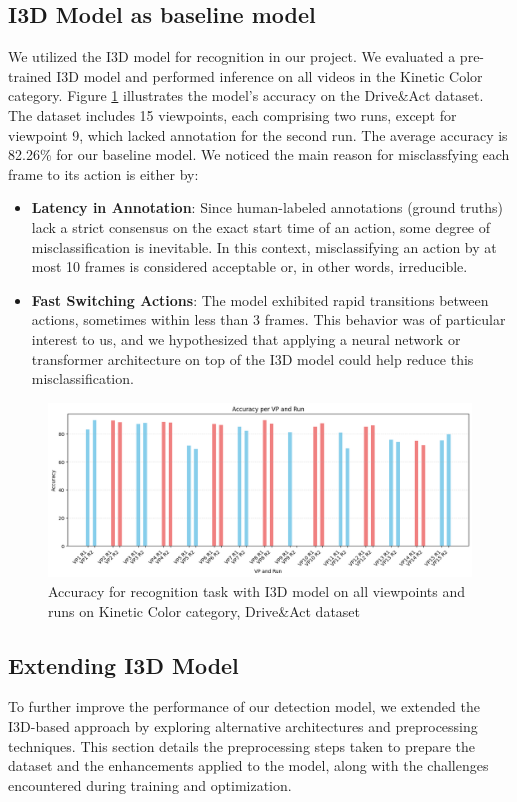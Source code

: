 \documentclass{article}
\begin{document}
\subsection{I3D Model as baseline model}
We utilized the I3D model for recognition in our project. We evaluated a pre-trained I3D model and performed inference on all videos in the Kinetic Color category. Figure \ref{fig:i3d-acc} illustrates the model's accuracy on the Drive\&Act dataset. The dataset includes 15 viewpoints, each comprising two runs, except for viewpoint 9, which lacked annotation for the second run. The average accuracy is 82.26\% for our baseline model.
We noticed the main reason for misclassfying each frame to its action is either by:
\begin{itemize}
    \item \textbf{Latency in Annotation}: Since human-labeled annotations (ground truths) lack a strict consensus on the exact start time of an action, some degree of misclassification is inevitable. In this context, misclassifying an action by at most 10 frames is considered acceptable or, in other words, irreducible.
    \item \textbf{Fast Switching Actions}: The model exhibited rapid transitions between actions, sometimes within less than 3 frames. This behavior was of particular interest to us, and we hypothesized that applying a neural network or transformer architecture on top of the I3D model could help reduce this misclassification.
\end{itemize}
\begin{figure}[ht]
    \centering
    \includegraphics[width=0.9\linewidth]{figs/i3d-acc.png}
    \caption{Accuracy for recognition task with I3D model on all viewpoints and runs on Kinetic Color category, Drive\&Act dataset}
    \label{fig:i3d-acc}
\end{figure}
\newpage
\subsection{Extending I3D Model}
To further improve the performance of our detection model, we extended the I3D-based approach by exploring alternative architectures and preprocessing techniques. This section details the preprocessing steps taken to prepare the dataset and the enhancements applied to the model, along with the challenges encountered during training and optimization.
\end{document}

